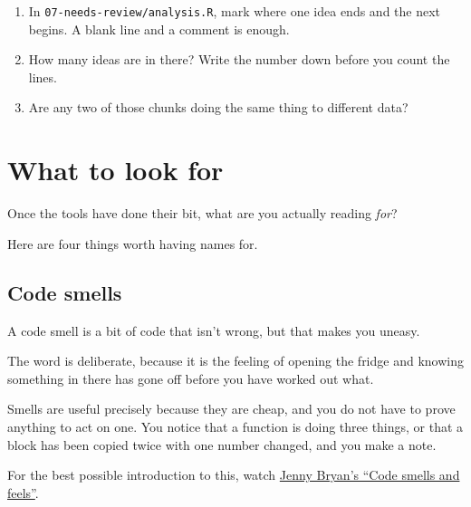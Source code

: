 \documentclass[
  letterpaper,
  justified,
  a4paper]{tufte-book}
\providecommand{\tightlist}{%
  \setlength{\itemsep}{0pt}\setlength{\parskip}{0pt}}
\providecommand{\tightlist}{%
  \setlength{\itemsep}{0pt}\setlength{\parskip}{0pt}}
\begin{document}
\begin{tcolorbox}[enhanced jigsaw, arc=.35mm, bottomrule=.15mm, bottomtitle=1mm, breakable, colback=white, colbacktitle=quarto-callout-note-color!10!white, colframe=quarto-callout-note-color-frame, coltitle=black, left=2mm, leftrule=.75mm, opacityback=0, opacitybacktitle=0.6, rightrule=.15mm, title=\textcolor{quarto-callout-note-color}{\faInfo}\hspace{0.5em}{Your Turn}, titlerule=0mm, toprule=.15mm, toptitle=1mm]

\begin{enumerate}
\def\labelenumi{\arabic{enumi}.}
\tightlist
\item
  In \texttt{07-needs-review/analysis.R}, mark where one idea ends and
  the next begins. A blank line and a comment is enough.
\item
  How many ideas are in there? Write the number down before you count
  the lines.
\item
  Are any two of those chunks doing the same thing to different data?
\end{enumerate}

\end{tcolorbox}

\section{What to look for}\label{what-to-look-for}

Once the tools have done their bit, what are you actually reading
\emph{for}?

Here are four things worth having names for.

\subsection{Code smells}\label{code-smells}

A code smell is a bit of code that isn't wrong, but that makes you
uneasy.

The word is deliberate, because it is the feeling of opening the fridge
and knowing something in there has gone off before you have worked out
what.

Smells are useful precisely because they are cheap, and you do not have
to prove anything to act on one. You notice that a function is doing
three things, or that a block has been copied twice with one number
changed, and you make a note.

For the best possible introduction to this, watch
\href{https://www.youtube.com/watch?v=7oyiPBjLAWY}{Jenny Bryan's ``Code
smells and feels''}.
\end{document}

